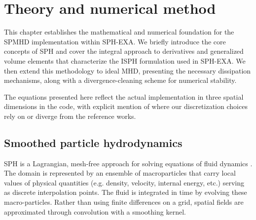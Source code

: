 
\section{Theory and numerical method}
\label{sec:theory}

This chapter establishes the mathematical and numerical foundation for the SPMHD implementation within SPH-EXA. We briefly introduce the core concepts of SPH and cover the integral approach to derivatives and generalized volume elements that characterize the ISPH formulation used in SPH-EXA. We then extend this methodology to ideal MHD, presenting the necessary dissipation mechanisms, along with a divergence-cleaning scheme for numerical stability.

The equations presented here reflect the actual implementation in three spatial dimensions in the code, with explicit mention of where our discretization choices rely on or diverge from the reference works. 

\subsection{Smoothed particle hydrodynamics}
\label{sec:sph}

SPH is a Lagrangian, mesh-free approach for solving equations of fluid dynamics \cite{Rosswog2009}. The domain is represented by an ensemble of macroparticles that carry local values of physical quantities (e.g. density, velocity, internal energy, etc.) serving as discrete interpolation points. The fluid is integrated in time by evolving these macro-particles. Rather than using finite differences on a grid, spatial fields are approximated through convolution with a smoothing kernel. %


